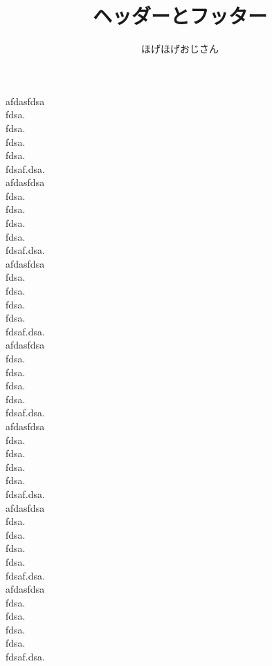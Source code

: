 \documentclass[a4paper, 11pt, uplatex]{jsarticle}
\begin{document}
\title{ヘッダーとフッター}
\author{ほげほげおじさん}
\maketitle

afdasfdsa
\\
fdsa.\\
fdsa.\\
fdsa.\\
fdsa.\\
fdsaf.dsa.\\


afdasfdsa
\\
fdsa.\\
fdsa.\\
fdsa.\\
fdsa.\\
fdsaf.dsa.\\

afdasfdsa
\\
fdsa.\\
fdsa.\\
fdsa.\\
fdsa.\\
fdsaf.dsa.\\

afdasfdsa
\\
fdsa.\\
fdsa.\\
fdsa.\\
fdsa.\\
fdsaf.dsa.\\

afdasfdsa
\\
fdsa.\\
fdsa.\\
fdsa.\\
fdsa.\\
fdsaf.dsa.\\

afdasfdsa
\\
fdsa.\\
fdsa.\\
fdsa.\\
fdsa.\\
fdsaf.dsa.\\

afdasfdsa
\\
fdsa.\\
fdsa.\\
fdsa.\\
fdsa.\\
fdsaf.dsa.\\
\end{document}
